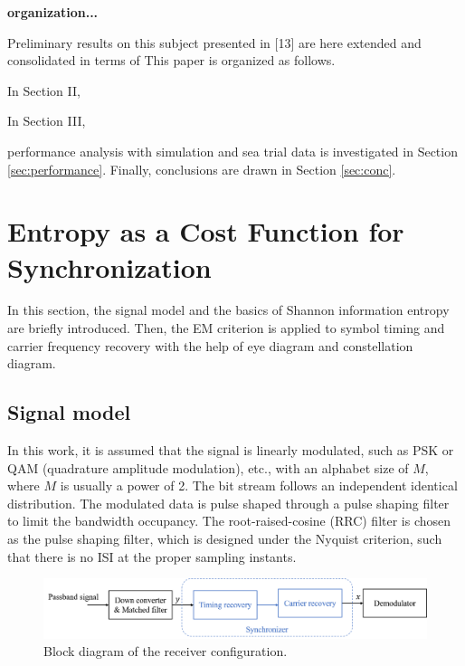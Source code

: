 \documentclass[journal,comsoc]{IEEEtran}
\begin{document}
\textbf{organization...}

Preliminary results on this subject presented in [13] are here extended and consolidated in terms of
This paper is organized as follows.

In Section II,

In Section III,

performance analysis with simulation and sea trial data is investigated in Section \ref{sec:performance}. 
Finally, conclusions are drawn in Section \ref{sec:conc}.

\section{Entropy as a Cost Function for Synchronization}
\label{sec:entropy}
In this section, the signal model and the basics of Shannon information entropy are briefly introduced.
Then, the EM criterion is applied to symbol timing and carrier frequency recovery with the help of eye diagram and constellation diagram.
\subsection{Signal model }  


In this work, it is assumed that the signal is linearly modulated, such as PSK or QAM (quadrature amplitude modulation), etc., with an alphabet size of \(M\), where \(M\) is usually a power of 2.
The bit stream follows an independent identical distribution.
The modulated data is pulse shaped through a pulse shaping filter to limit the bandwidth occupancy.
The root-raised-cosine (RRC) filter is chosen as the pulse shaping filter, which is designed under the Nyquist criterion, 
such that there is no ISI at the proper sampling instants.
\begin{figure}[ht]
\centering
\includegraphics[width=5.5 in]{pic/sys_conf.png}
\caption{Block diagram of the receiver configuration.}
\label{fig:sysconf} 
\end{figure}
\end{document}
